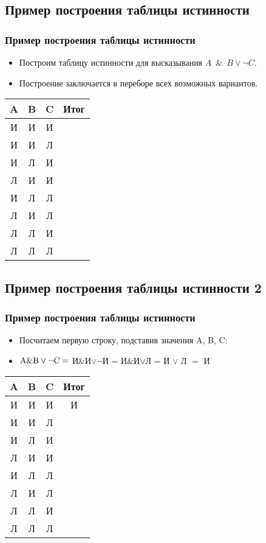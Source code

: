 \documentclass[compress,red]{beamer}
\begin{document}
\subsection{Пример построения таблицы истинности}
\begin{frame}[fragile]
  \frametitle{Пример построения таблицы истинности}
  \begin{itemize}
    \item Построим таблицу истинности для высказывания $A$~\&~$B\vee{\neg}C$.
    \item Построение заключается в переборе всех возможных вариантов.
  \end{itemize}
  \begin{center}
  \begin{tabular}{|c|c|c|c|}
    \hline
    A & B & C & Итог \\
    \hline
    И & И & И &  \\
    \hline
    И & И & Л &  \\
    \hline
    И & Л & И &  \\
    \hline
    Л & И & И &  \\
    \hline
    И & Л & Л &  \\
    \hline
    Л & И & Л &  \\
    \hline
    Л & Л & И &  \\
    \hline
    Л & Л & Л &  \\
    \hline
  \end{tabular}
  \end{center}
\end{frame}

\subsection{Пример построения таблицы истинности 2}
\begin{frame}[fragile]
  \frametitle{Пример построения таблицы истинности}
  \begin{itemize}
    \item Посчитаем первую строку, подставив значения A, B, C:
    \item $\rm{A}\&\rm{B}\vee{\neg}\rm{C} =$ И$\&$И$\vee{\neg}$И = И$\&$И$\vee$Л = И $\vee$ Л $=$ И
  \end{itemize}
  \begin{center}
  \begin{tabular}{|c|c|c|c|}
    \hline
    A & B & C & Итог \\
    \hline
    И & И & И & И \\
    \hline
    И & И & Л &  \\
    \hline
    И & Л & И &  \\
    \hline
    Л & И & И &  \\
    \hline
    И & Л & Л &  \\
    \hline
    Л & И & Л &  \\
    \hline
    Л & Л & И &  \\
    \hline
    Л & Л & Л &  \\
    \hline
  \end{tabular}
  \end{center}
\end{frame}
\end{document}
